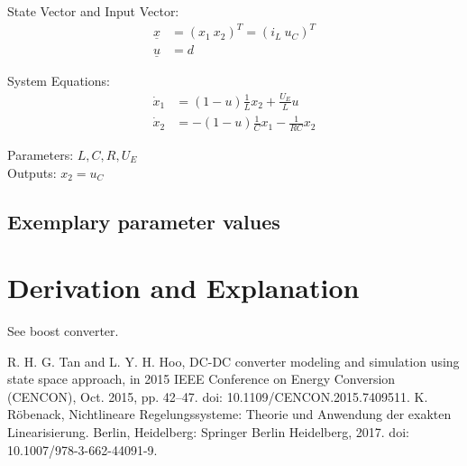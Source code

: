 \documentclass[10pt,a4paper]{article}
\begin{document}
	State Vector and Input Vector:
	\begin{align*}
		\underline{x} &= (x_1 \ x_2)^T = (i_L \ u_C)^T \\
		\underline{u} &= d
	\end{align*}
	
	\noindent System Equations:			
	\begin{subequations}
	\begin{align}
		\dot{x}_1 &= (1-u)\frac{1}{L}x_2 + \frac{U_E}{L}u \\
		\dot{x}_2 &= -(1-u)\frac{1}{C}x_1 - \frac{1}{RC}x_2
	\end{align}
	\end{subequations}

	\noindent
	Parameters: $L, C, R, U_E$ %
	\\
	Outputs: $x_2 = u_C$
	
	
	
	
	\subsection{Exemplary parameter values}
	

	
	\section{Derivation and Explanation} %
	See boost converter.
	
	
	\begin{thebibliography}{10}		
		R. H. G. Tan and L. Y. H. Hoo, DC-DC converter modeling and simulation using state space approach, in 2015 IEEE Conference on Energy Conversion (CENCON), Oct. 2015, pp. 42–47. doi: 10.1109/CENCON.2015.7409511.
		K. Röbenack, Nichtlineare Regelungssysteme: Theorie und Anwendung der exakten Linearisierung. Berlin, Heidelberg: Springer Berlin Heidelberg, 2017. doi: 10.1007/978-3-662-44091-9.
	\end{thebibliography}
\end{document}
